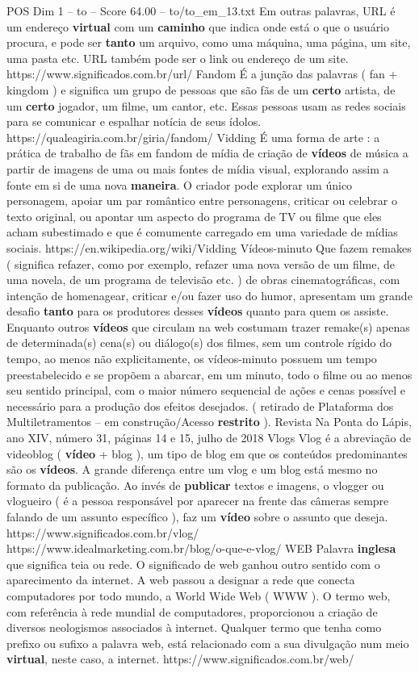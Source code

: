 \begin{textsample}{POS Dim 1 – to – Score 64.00 – to/to\_em\_13.txt}
Em outras palavras, URL é um endereço \textbf{virtual} com um \textbf{caminho} que indica onde está o que o usuário procura, e pode ser \textbf{tanto} um arquivo, como uma máquina, uma página, um site, uma pasta etc.
URL também pode ser o link ou endereço de um site. https://www.significados.com.br/url/ Fandom É a junção das palavras ( fan + kingdom ) e significa um grupo de pessoas que são fãs de um \textbf{certo} artista, de um \textbf{certo} jogador, um filme, um cantor, etc.
Essas pessoas usam as redes sociais para se comunicar e espalhar notícia de seus ídolos. https://qualeagiria.com.br/giria/fandom/ Vidding É uma forma de arte : a prática de trabalho de fãs em fandom de mídia de criação de \textbf{vídeos} de música a partir de imagens de uma ou mais fontes de mídia visual, explorando assim a fonte em si de uma nova \textbf{maneira}.
O criador pode explorar um único personagem, apoiar um par romântico entre personagens, criticar ou celebrar o texto original, ou apontar um aspecto do programa de TV ou filme que eles acham subestimado e que é comumente carregado em uma variedade de mídias sociais. https://en.wikipedia.org/wiki/Vidding Vídeos-minuto Que fazem remakes ( significa refazer, como por exemplo, refazer uma nova versão de um filme, de uma novela, de um programa de televisão etc. ) de obras cinematográficas, com intenção de homenagear, criticar e/ou fazer uso do humor, apresentam um grande desafio \textbf{tanto} para os produtores desses \textbf{vídeos} quanto para quem os assiste.
Enquanto outros \textbf{vídeos} que circulam na web costumam trazer remake(s) apenas de determinada(s) cena(s) ou diálogo(s) dos filmes, sem um controle rígido do tempo, ao menos não explicitamente, os vídeos-minuto possuem um tempo preestabelecido e se propõem a abarcar, em um minuto, todo o filme ou ao menos seu sentido principal, com o maior número sequencial de ações e cenas possível e necessário para a produção dos efeitos desejados. ( retirado de Plataforma dos Multiletramentos – em construção/Acesso \textbf{restrito} ).
Revista Na Ponta do Lápis, ano XIV, número 31, páginas 14 e 15, julho de 2018 Vlogs Vlog é a abreviação de videoblog ( \textbf{vídeo} + blog ), um tipo de blog em que os conteúdos predominantes são os \textbf{vídeos}.
A grande diferença entre um vlog e um blog está mesmo no formato da publicação.
Ao invés de \textbf{publicar} textos e imagens, o vlogger ou vlogueiro ( é a pessoa responsável por aparecer na frente das câmeras sempre falando de um assunto específico ), faz um \textbf{vídeo} sobre o assunto que deseja. https://www.significados.com.br/vlog/ https://www.idealmarketing.com.br/blog/o-que-e-vlog/ WEB Palavra \textbf{inglesa} que significa teia ou rede.
O significado de web ganhou outro sentido com o aparecimento da internet.
A web passou a designar a rede que conecta computadores por todo mundo, a World Wide Web ( WWW ).
O termo web, com referência à rede mundial de computadores, proporcionou a criação de diversos neologismos associados à internet.
Qualquer termo que tenha como prefixo ou sufixo a palavra web, está relacionado com a sua divulgação num meio \textbf{virtual}, neste caso, a internet. https://www.significados.com.br/web/


\end{textsample}
